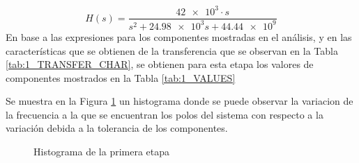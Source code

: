 \begin{equation}
    H(s) = \frac{\num{42e3}\cdot s}{s^2 + \num{24.98e3}s + \num{44.44e9}}
    \label{eq:1_TRANFER}
\end{equation}
En base a las expresiones para los componentes mostradas en el an\'alisis, y en las caracter\'isticas que se obtienen de la transferencia que se observan en la Tabla \ref{tab:1_TRANSFER_CHAR}, se obtienen para esta etapa los valores de componentes mostrados en la Tabla \ref{tab:1_VALUES}
\begin{table}[H]
    \centering
    \caption{Caracter\'isticas de la primera etapa}
    \label{tab:1_TRANSFER_CHAR}
\end{table}
\begin{table}[H]
    \centering
    \caption{Valores de componentes para la primera etapa}
    \label{tab:1_VALUES}
\end{table}
Se muestra en la Figura \ref{fig:1_HIST} un histograma donde se puede observar la variacion de la frecuencia a la que se encuentran los polos del sistema con respecto a la variaci\'on debida a la tolerancia de los componentes.
\begin{figure}[H]
    \centering
    \caption{Histograma de la primera etapa}
    \label{fig:1_HIST}
\end{figure}
